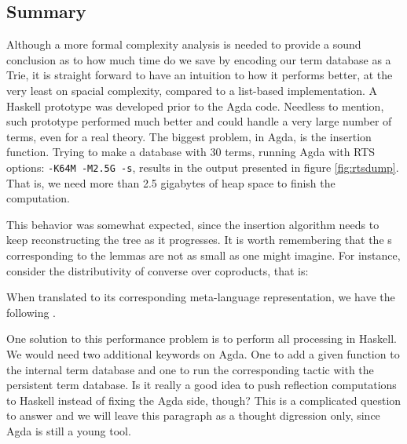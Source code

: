 \subsection{Summary}

Although a more formal complexity analysis is needed to provide a sound conclusion as to
how much time do we save by encoding our term database as a Trie, it is straight forward to have
an intuition to how it performs better, at the very least on spacial complexity, compared to a list-based
implementation. A Haskell prototype was developed prior to the Agda code. Needless to mention,
such prototype performed much better and could handle a very large number of terms, even for a real theory.
The biggest problem, in Agda, is the insertion function. Trying to make a database with 30 terms,
running Agda with RTS options: \texttt{\small -K64M -M2.5G -s}, results in the output presented
in figure \ref{fig:rtsdump}. That is, we need more than 2.5 gigabytes of heap space to finish
the computation.

This behavior was somewhat expected, since the insertion algorithm needs to keep
reconstructing the tree as it progresses. It is worth remembering that the s
corresponding to the lemmas are not as small as one might imagine. For instance,
consider the distributivity of converse over coproducts, that is:


When translated to its corresponding meta-language representation, we have the following .


One solution to this performance problem is to perform all processing in Haskell. We would need
two additional keywords on Agda. One to add a given function to the internal term database
and one to run the corresponding  tactic with the persistent term database. Is it really
a good idea to push reflection computations to Haskell instead of fixing the Agda side, though?
This is a complicated question to answer and we will leave this paragraph as a thought
digression only, since Agda is still a young tool.



